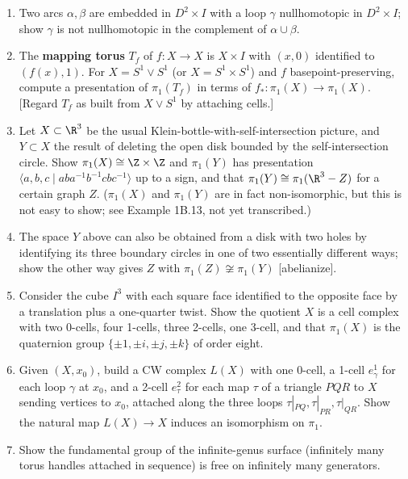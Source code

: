 \begin{enumerate}
\item Two arcs $\alpha,\beta$ are embedded in $D^2\times I$ with a loop $\gamma$
nullhomotopic in $D^2\times I$; show $\gamma$ is not nullhomotopic in the
complement of $\alpha\cup\beta$.

\item The \textbf{mapping torus} $T_f$ of $f:X\to X$ is $X\times I$ with $(x,0)$
identified to $(f(x),1)$. For $X=S^1\vee S^1$ (or $X=S^1\times S^1$) and $f$
basepoint-preserving, compute a presentation of $\pi_1(T_f)$ in terms of
$f_*:\pi_1(X)\to\pi_1(X)$. [Regard $T_f$ as built from $X\vee S^1$ by attaching
cells.]

\item Let $X\subset\R^3$ be the usual Klein-bottle-with-self-intersection picture,
and $Y\subset X$ the result of deleting the open disk bounded by the
self-intersection circle. Show $\pi_1(X)\cong\Z\times\Z$ and $\pi_1(Y)$ has
presentation $\langle a,b,c \mid aba^{-1}b^{-1}cbc^{-1}\rangle$ up to a sign, and that
$\pi_1(Y) \cong \pi_1(\R^3-Z)$ for a certain graph $Z$. ($\pi_1(X)$ and $\pi_1(Y)$ are
in fact non-isomorphic, but this is not easy to show; see Example 1B.13, not yet
transcribed.)

\item The space $Y$ above can also be obtained from a disk with two holes by
identifying its three boundary circles in one of two essentially different ways;
show the other way gives $Z$ with $\pi_1(Z) \not\cong \pi_1(Y)$ [abelianize].

\item Consider the cube $I^3$ with each square face identified to the opposite
face by a translation plus a one-quarter twist. Show the quotient $X$ is a cell
complex with two 0-cells, four 1-cells, three 2-cells, one 3-cell, and that
$\pi_1(X)$ is the quaternion group $\{\pm1,\pm i,\pm j,\pm k\}$ of order eight.

\item Given $(X,x_0)$, build a CW complex $L(X)$ with one 0-cell, a 1-cell
$e_\gamma^1$ for each loop $\gamma$ at $x_0$, and a 2-cell $e_\tau^2$ for each map $\tau$ of a
triangle $PQR$ to $X$ sending vertices to $x_0$, attached along the three loops
$\tau|_{PQ},\tau|_{PR},\tau|_{QR}$. Show the natural map $L(X)\to X$ induces an
isomorphism on $\pi_1$.

\item Show the fundamental group of the infinite-genus surface (infinitely many
torus handles attached in sequence) is free on infinitely many generators.


\end{enumerate}
